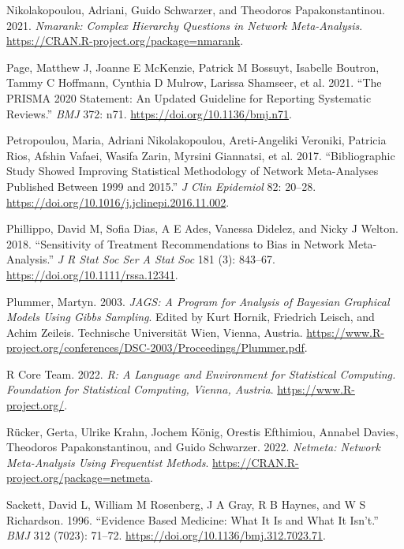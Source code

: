 \begin{CSLReferences}{1}{0}
\leavevmode{}%
Nikolakopoulou, Adriani, Guido Schwarzer, and Theodoros Papakonstantinou. 2021. \emph{Nmarank: Complex Hierarchy Questions in Network Meta-Analysis}. \url{https://CRAN.R-project.org/package=nmarank}.

\leavevmode{}%
Page, Matthew J, Joanne E McKenzie, Patrick M Bossuyt, Isabelle Boutron, Tammy C Hoffmann, Cynthia D Mulrow, Larissa Shamseer, et al. 2021. {``The PRISMA 2020 Statement: An Updated Guideline for Reporting Systematic Reviews.''} \emph{BMJ} 372: n71. \url{https://doi.org/10.1136/bmj.n71}.

\leavevmode{}%
Petropoulou, Maria, Adriani Nikolakopoulou, Areti-Angeliki Veroniki, Patricia Rios, Afshin Vafaei, Wasifa Zarin, Myrsini Giannatsi, et al. 2017. {``Bibliographic Study Showed Improving Statistical Methodology of Network Meta-Analyses Published Between 1999 and 2015.''} \emph{J Clin Epidemiol} 82: 20--28. \url{https://doi.org/10.1016/j.jclinepi.2016.11.002}.

\leavevmode{}%
Phillippo, David M, Sofia Dias, A E Ades, Vanessa Didelez, and Nicky J Welton. 2018. {``Sensitivity of Treatment Recommendations to Bias in Network Meta-Analysis.''} \emph{J R Stat Soc Ser A Stat Soc} 181 (3): 843--67. \url{https://doi.org/10.1111/rssa.12341}.

\leavevmode{}%
Plummer, Martyn. 2003. \emph{JAGS: A Program for Analysis of Bayesian Graphical Models Using Gibbs Sampling}. Edited by Kurt Hornik, Friedrich Leisch, and Achim Zeileis. Technische Universität Wien, Vienna, Austria. \url{https://www.R-project.org/conferences/DSC-2003/Proceedings/Plummer.pdf}.

\leavevmode{}%
R Core Team. 2022. \emph{{R: A Language and Environment for Statistical Computing}. Foundation for Statistical Computing, Vienna, Austria}. \url{https://www.R-project.org/}.

\leavevmode{}%
Rücker, Gerta, Ulrike Krahn, Jochem König, Orestis Efthimiou, Annabel Davies, Theodoros Papakonstantinou, and Guido Schwarzer. 2022. \emph{Netmeta: Network Meta-Analysis Using Frequentist Methods}. \url{https://CRAN.R-project.org/package=netmeta}.

\leavevmode{}%
Sackett, David L, William M Rosenberg, J A Gray, R B Haynes, and W S Richardson. 1996. {``Evidence Based Medicine: What It Is and What It Isn't.''} \emph{BMJ} 312 (7023): 71--72. \url{https://doi.org/10.1136/bmj.312.7023.71}.


\end{CSLReferences}
